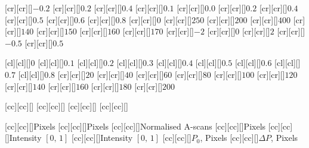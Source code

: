 [cr][cr][\tickFig]{$-0.2$}
[cr][cr][\tickFig]{$ 0.2$}
[cr][cr][\tickFig]{$ 0.4$}
[cr][cr][\tickFig]{$ 0.1$}
[cr][cr][\tickFig]{$ 0.0$}
[cr][cr][\tickFig]{$ 0.2$}
[cr][cr][\tickFig]{$ 0.4$}
[cr][cr][\tickFig]{$ 0.5$}
[cr][cr][\tickFig]{$ 0.6$}
[cr][cr][\tickFig]{$ 0.8$}
[cr][cr][\tickFig]{$ 0$}
[cr][cr][\tickFig]{$ 250$}
[cr][cr][\tickFig]{$ 200$}
[cr][cr][\tickFig]{$ 400$}
[cr][cr][\tickFig]{$ 140$}
[cr][cr][\tickFig]{$ 150$}
[cr][cr][\tickFig]{$ 160$}
[cr][cr][\tickFig]{$ 170$}
[cr][cr][\tickFig]{$-2$}
[cr][cr][\tickFig]{$ 0$}
[cr][cr][\tickFig]{$ 2$}
[cr][cr][\tickFig]{$-0.5$}
[cr][cr][\tickFig]{$ 0.5$}

[cl][cl][\tickFig]{$0$}
[cl][cl][\tickFig]{$0.1$}
[cl][cl][\tickFig]{$0.2$}
[cl][cl][\tickFig]{$0.3$}
[cl][cl][\tickFig]{$0.4$}
[cl][cl][\tickFig]{$0.5$}
[cl][cl][\tickFig]{$0.6$}
[cl][cl][\tickFig]{$0.7$}
[cl][cl][\tickFig]{$0.8$}
[cr][cr][\tickFig]{$ 20$}
[cr][cr][\tickFig]{$ 40$}
[cr][cr][\tickFig]{$ 60$}
[cr][cr][\tickFig]{$ 80$}
[cr][cr][\tickFig]{$ 100$}
[cr][cr][\tickFig]{$ 120$}
[cr][cr][\tickFig]{$ 140$}
[cr][cr][\tickFig]{$ 160$}
[cr][cr][\tickFig]{$ 180$}
[cr][cr][\tickFig]{$ 200$}


[cc][cc][]{}
[cc][cc][]{}
[cc][cc][]{}
[cc][cc][]{}

[cc][cc][]{Pixels}
[cc][cc][]{Pixels}
[cc][cc][]{Normalised A-scans}
[cc][cc][]{Pixels}
[cc][cc][]{Intensity $[0,\,1]$}
[cc][cc][]{Intensity $[0,\,1]$}
[cc][cc][]{$P_0$, Pixels}
[cc][cc][]{$\Delta P$, Pixels}

